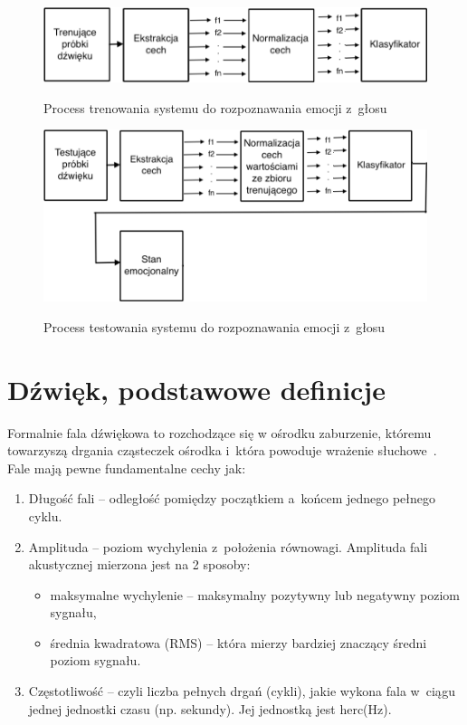 \documentclass[declaration,shortabstract]{iithesis}
\begin{document}
\begin{figure}[!htb]
\hspace*{-6cm}
	\caption{Process trenowania systemu do rozpoznawania emocji z~głosu}
	\includegraphics[scale=0.40]{trenowanie.png}
\label{ser_tren}
\end{figure}

\begin{figure}[!htb]
\hspace*{-6cm}  
	\caption{Process testowania systemu do rozpoznawania emocji z~głosu}
	\includegraphics[scale=0.35]{testowanie.png}
\label{ser_test}
\end{figure}

\section{Dźwięk, podstawowe definicje}
Formalnie fala dźwiękowa to rozchodzące się w ośrodku zaburzenie, któremu towarzyszą drgania cząsteczek ośrodka i~która powoduje wrażenie słuchowe~\cite{Akustyka}. Fale mają pewne fundamentalne cechy jak:
\begin{enumerate}
\item Długość fali -- odległość pomiędzy początkiem a~końcem jednego pełnego cyklu.
\item Amplituda -- poziom wychylenia z~położenia równowagi. Amplituda fali akustycznej mierzona jest na 2 sposoby:
	\begin{itemize}
	\item maksymalne wychylenie -- maksymalny pozytywny lub negatywny poziom sygnału,
	\item średnia kwadratowa (RMS) -- która mierzy bardziej znaczący średni poziom sygnału.
	\end{itemize}
\item Częstotliwość -- czyli liczba pełnych drgań (cykli), jakie wykona fala w~ciągu jednej jednostki czasu (np. sekundy). Jej jednostką jest herc(Hz).
\end{enumerate}
\end{document}
